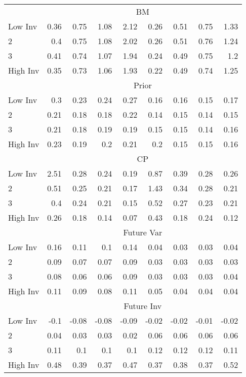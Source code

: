 \begin{table}[!ht]
\begin{tabular}{lrrrrrrrr}
  
    & \multicolumn{8}{c}{BM}  \\
     \cmidrule(r){2-5} \cmidrule(r){6-9}
    Low Inv  & 0.36  & 0.75  & 1.08  & 2.12  & 0.26  & 0.51  & 0.75  & 1.33   \\
    2  & 0.4  & 0.75  & 1.08  & 2.02  & 0.26  & 0.51  & 0.76  & 1.24   \\
    3  & 0.41  & 0.74  & 1.07  & 1.94  & 0.24  & 0.49  & 0.75  & 1.2   \\
    High Inv  & 0.35  & 0.73  & 1.06  & 1.93  & 0.22  & 0.49  & 0.74  & 1.25   \\
    
  
    & \multicolumn{8}{c}{Prior}  \\
     \cmidrule(r){2-5} \cmidrule(r){6-9}
    Low Inv  & 0.3  & 0.23  & 0.24  & 0.27  & 0.16  & 0.16  & 0.15  & 0.17   \\
    2  & 0.21  & 0.18  & 0.18  & 0.22  & 0.14  & 0.15  & 0.14  & 0.15   \\
    3  & 0.21  & 0.18  & 0.19  & 0.19  & 0.15  & 0.15  & 0.14  & 0.16   \\
    High Inv  & 0.23  & 0.19  & 0.2  & 0.21  & 0.2  & 0.15  & 0.15  & 0.16   \\
    
  
    & \multicolumn{8}{c}{CP}  \\
     \cmidrule(r){2-5} \cmidrule(r){6-9}
    Low Inv  & 2.51  & 0.28  & 0.24  & 0.19  & 0.87  & 0.39  & 0.28  & 0.26   \\
    2  & 0.51  & 0.25  & 0.21  & 0.17  & 1.43  & 0.34  & 0.28  & 0.21   \\
    3  & 0.4  & 0.24  & 0.21  & 0.15  & 0.52  & 0.27  & 0.23  & 0.21   \\
    High Inv  & 0.26  & 0.18  & 0.14  & 0.07  & 0.43  & 0.18  & 0.24  & 0.12   \\
  
    & \multicolumn{8}{c}{Future Var}  \\
     \cmidrule(r){2-5} \cmidrule(r){6-9}
    Low Inv  & 0.16  & 0.11  & 0.1  & 0.14  & 0.04  & 0.03  & 0.03  & 0.04   \\
    2  & 0.09  & 0.07  & 0.07  & 0.09  & 0.03  & 0.03  & 0.03  & 0.03   \\
    3  & 0.08  & 0.06  & 0.06  & 0.09  & 0.03  & 0.03  & 0.03  & 0.04   \\
    High Inv  & 0.11  & 0.09  & 0.08  & 0.11  & 0.05  & 0.04  & 0.04  & 0.04   \\
  
    & \multicolumn{8}{c}{Future Inv}  \\
     \cmidrule(r){2-5} \cmidrule(r){6-9}
    Low Inv  & -0.1  & -0.08  & -0.08  & -0.09  & -0.02  & -0.02  & -0.01  & -0.02   \\
    2  & 0.04  & 0.03  & 0.03  & 0.02  & 0.06  & 0.06  & 0.06  & 0.06   \\
    3  & 0.11  & 0.1  & 0.1  & 0.1  & 0.12  & 0.12  & 0.12  & 0.11   \\
    High Inv  & 0.48  & 0.39  & 0.37  & 0.47  & 0.37  & 0.38  & 0.37  & 0.52   \\
    

\end{tabular}
\end{table}
